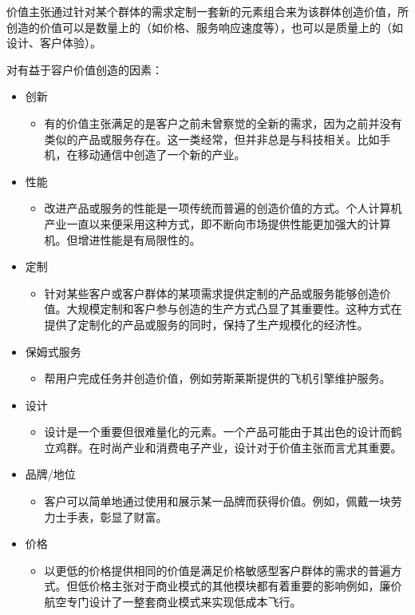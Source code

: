 	价值主张通过针对某个群体的需求定制一套新的元素组合来为该群体创造价值，所创造的价值可以是数量上的（如价格、服务响应速度等），也可以是质量上的（如设计、客户体验）。
		
	对有益于容户价值创造的因素：
	\begin{itemize}
		\item 创新
		\begin{itemize}
			\item 有的价值主张满足的是客户之前未曾察觉的全新的需求，因为之前并没有类似的产品或服务存在。这一类经常，但并非总是与科技相关。比如手机，在移动通信中创造了一个新的产业。
		\end{itemize}
		\item 性能 
		\begin{itemize}
			\item 改进产品或服务的性能是一项传统而普遍的创造价值的方式。个人计算机产业一直以来便采用这种方式，即不断向市场提供性能更加强大的计算机。但增进性能是有局限性的。
		\end{itemize}
		\item 定制
		\begin{itemize}
			\item 针对某些客户或客户群体的某项需求提供定制的产品或服务能够创造价值。大规模定制和客户参与创造的生产方式凸显了其重要性。这种方式在提供了定制化的产品或服务的同时，保持了生产规模化的经济性。
		\end{itemize}
		\item 保姆式服务
		\begin{itemize}
			\item 帮用户完成任务并创造价值，例如劳斯莱斯提供的飞机引擎维护服务。           
		\end{itemize}
		\item 设计
		\begin{itemize}
			\item 设计是一个重要但很难量化的元素。一个产品可能由于其出色的设计而鹤立鸡群。在时尚产业和消费电子产业，设计对于价值主张而言尤其重要。
		\end{itemize}
		\item 品牌/地位
		\begin{itemize}
			\item 客户可以简单地通过使用和展示某一品牌而获得价值。例如，佩戴一块劳力士手表，彰显了财富。           
		\end{itemize}
		\item 价格
		\begin{itemize}
			\item 以更低的价格提供相同的价值是满足价格敏感型客户群体的需求的普遍方式。但低价格主张对于商业模式的其他模块都有着重要的影响例如，廉价航空专门设计了一整套商业模式来实现低成本飞行。

\end{itemize}
\end{itemize}

